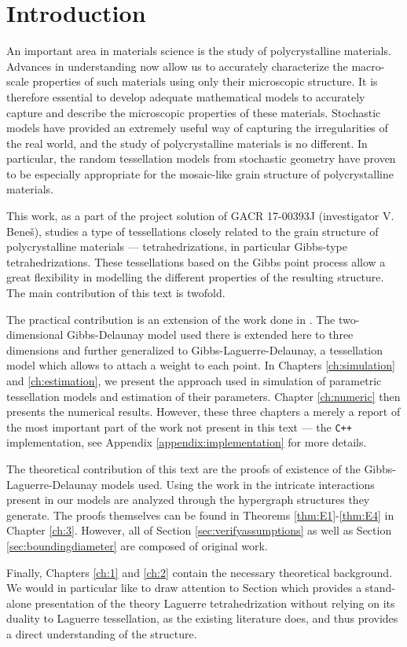 \chapter*{Introduction}

An important area in materials science is the study of polycrystalline materials. Advances in understanding now allow us to accurately characterize the macro-scale properties of such materials using only their microscopic structure. It is therefore essential to develop adequate mathematical models to accurately capture and describe the microscopic properties of these materials.
Stochastic models have provided an extremely useful way of capturing the irregularities of the real world, and the study of polycrystalline materials is no different. In particular, the random tessellation models from stochastic geometry have proven to be especially appropriate for the mosaic-like grain structure of polycrystalline materials. 

This work, as a part of the project solution of GACR 17-00393J (investigator V. Bene\v{s}), studies a type of tessellations closely related to the grain structure of polycrystalline materials --- tetrahedrizations, in particular Gibbs-type tetrahedrizations. These tessellations based on the Gibbs point process allow a great flexibility in modelling the different properties of the resulting structure. 
The main contribution of this text is twofold. 

The practical contribution is an extension of the work done in \cite{DereudreLavancier2011}. The two-dimensional Gibbs-Delaunay model used there is extended here to three dimensions and further generalized to Gibbs-Laguerre-Delaunay, a tessellation model which allows to attach a weight to each point. In Chapters \ref{ch:simulation} and \ref{ch:estimation}, we present the approach used in simulation of parametric tessellation models and estimation of their parameters. Chapter \ref{ch:numeric} then presents the numerical results. However, these three chapters a merely a report of the most important part of the work not present in this text --- the \texttt{C++} implementation, see Appendix \ref{appendix:implementation} for more details. 

The theoretical contribution of this text are the proofs of existence of the Gibbs-Laguerre-Delaunay models used. Using the work in \cite{DDG12} the intricate interactions present in our models are analyzed through the hypergraph structures they generate. The proofs themselves can be found in Theorems \ref{thm:E1}-\ref{thm:E4} in Chapter \ref{ch:3}. However, all of Section \ref{sec:verifyassumptions} as well as Section \ref{sec:boundingdiameter} are composed of original work. 

Finally, Chapters \ref{ch:1} and \ref{ch:2} contain the necessary theoretical background. We would in particular like to draw attention to Section \label{sec:Laguerre} which provides a stand-alone presentation of the theory Laguerre tetrahedrization without relying on its duality to Laguerre tessellation, as the existing literature does, and thus provides a direct understanding of the structure. 

